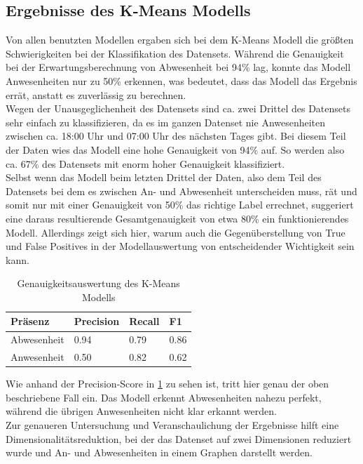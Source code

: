 \subsection{Ergebnisse des K-Means Modells}\label{KMeans}
Von allen benutzten Modellen ergaben sich bei dem K-Means Modell die größten Schwierigkeiten bei der 
Klassifikation des Datensets. 
Während die Genauigkeit bei der Erwartungsberechnung von Abwesenheit bei 94\% lag, konnte das
Modell Anwesenheiten nur zu 50\% erkennen, was bedeutet, dass das Modell das Ergebnis errät, anstatt
es zuverlässig zu berechnen. \\
Wegen der Unausgeglichenheit des Datensets sind ca. zwei Drittel des Datensets sehr einfach zu 
klassifizieren, da es im ganzen Datenset nie Anwesenheiten zwischen ca. 18:00 Uhr und 07:00 Uhr des nächsten 
Tages gibt. Bei diesem Teil der Daten wies das Modell eine hohe Genauigkeit von 94\% auf. So werden also 
ca. 67\% des Datensets mit enorm hoher Genauigkeit klassifiziert.\\
Selbst wenn das Modell beim letzten Drittel der Daten, also dem Teil des Datensets bei dem es zwischen
An- und Abwesenheit unterscheiden muss, rät und somit nur mit einer Genauigkeit von 50\% das richtige Label 
errechnet, suggeriert eine daraus resultierende Gesamtgenauigkeit von etwa 80\% ein funktionierendes Modell.
Allerdings zeigt sich hier, warum auch die Gegenüberstellung von True und False Positives in der 
Modellauswertung von entscheidender Wichtigkeit sein kann.\\

\begin{center}
    \begin{table}[h]
        \centering
        \caption{Genauigkeitsauswertung des K-Means Modells}
        \begin{tabular}{|p{2.5cm}||p{1.8cm}|p{1.5cm}|p{1.5cm}|}
            \hline
            \hfill Präsenz&\hfill Precision &\hfill Recall &\hfill F1\\
            \hline
            \hline
            \hfill Abwesenheit&\hfill 0.94&\hfill 0.79&\hfill 0.86\\
            \hfill Anwesenheit&\hfill 0.50&\hfill 0.82&\hfill 0.62\\
            \hline
        \end{tabular}          
        \label{tab:clus}
    \end{table}
\end{center}

Wie anhand der Precision-Score in \ref{tab:clus} zu sehen ist, tritt hier genau der oben beschriebene Fall ein.
Das Modell erkennt Abwesenheiten nahezu perfekt, während die übrigen Anwesenheiten nicht klar erkannt werden.\\
\newpage
Zur genaueren Untersuchung und Veranschaulichung der Ergebnisse hilft eine Dimensionalitätsreduktion, 
bei der das Datenset auf zwei Dimensionen reduziert wurde und An- und Abwesenheiten in einem Graphen darstellt werden.

